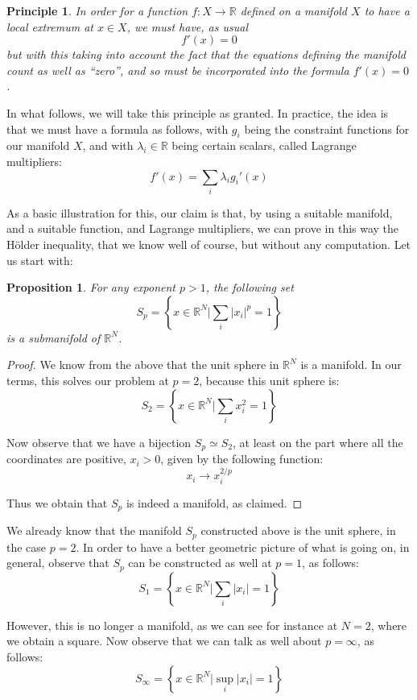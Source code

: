 \documentclass[12pt]{amsbook}
\newtheorem{principle}[theorem]{Principle}
\newtheorem{proposition}[theorem]{Proposition}
\begin{document}
\begin{principle}
In order for a function $f:X\to\mathbb R$ defined on a manifold $X$ to have a local extremum at $x\in X$, we must have, as usual 
$$f'(x)=0$$
but with this taking into account the fact that the equations defining the manifold count as well as ``zero'', and so must be incorporated into the formula $f'(x)=0$. 
\end{principle}

In what follows, we will take this principle as granted. In practice, the idea is that we must have a formula as follows, with $g_i$ being the constraint functions for our manifold $X$, and with $\lambda_i\in\mathbb R$ being certain scalars, called Lagrange multipliers:
$$f'(x)=\sum_i\lambda_ig_i'(x)$$

As a basic illustration for this, our claim is that, by using a suitable manifold, and a suitable function, and Lagrange multipliers, we can prove in this way the H\"older inequality, that we know well of course, but without any computation. Let us start with:

\begin{proposition}
For any exponent $p>1$, the following set
$$S_p=\left\{x\in\mathbb R^N\Big|\sum_i|x_i|^p=1\right\}$$
is a submanifold of $\mathbb R^N$.
\end{proposition}

\begin{proof}
We know from the above that the unit sphere in $\mathbb R^N$ is a manifold. In our terms, this solves our problem at $p=2$, because this unit sphere is:
$$S_2=\left\{x\in\mathbb R^N\Big|\sum_ix_i^2=1\right\}$$

Now observe that we have a bijection $S_p\simeq S_2$, at least on the part where all the coordinates are positive, $x_i>0$, given by the following function:
$$x_i\to x_i^{2/p}$$

Thus we obtain that $S_p$ is indeed a manifold, as claimed.
\end{proof}

We already know that the manifold $S_p$ constructed above is the unit sphere, in the case $p=2$. In order to have a better geometric picture of what is going on, in general, observe that $S_p$ can be constructed as well at $p=1$, as follows:
$$S_1=\left\{x\in\mathbb R^N\Big|\sum_i|x_i|=1\right\}$$

However, this is no longer a manifold, as we can see for instance at $N=2$, where we obtain a square. Now observe that we can talk as well about $p=\infty$, as follows:
$$S_\infty=\left\{x\in\mathbb R^N\Big|\sup_i|x_i|=1\right\}$$
\end{document}
